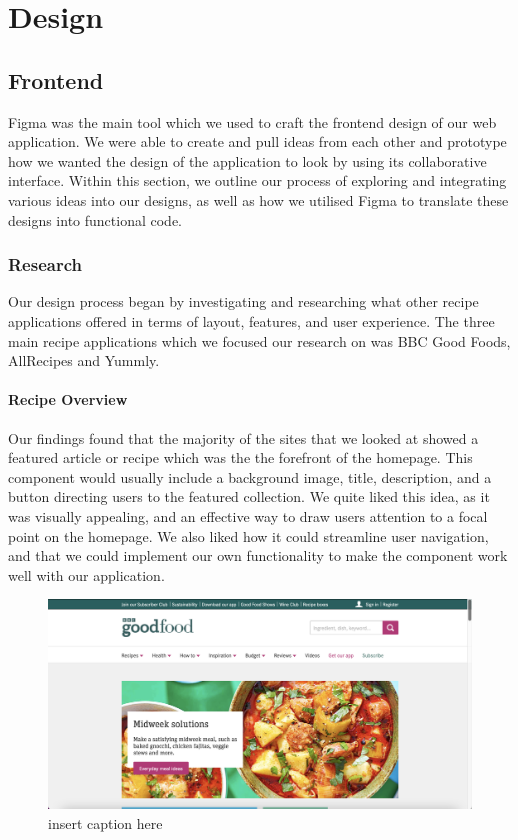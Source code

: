 \documentclass{article}
\begin{document}
    \section{Design}
    \subsection{Frontend}
    Figma was the main tool which we used to craft the frontend design of our web application. We were able to create and pull ideas from each other and prototype how we wanted the design of the application to look by using its collaborative interface. Within this section, we outline our process of exploring and integrating various ideas into our designs, as well as how we utilised Figma to translate these designs into functional code.

    \subsubsection{Research}
    
    Our design process began by investigating and researching what other recipe applications offered in terms of layout, features, and user experience. The three main recipe applications which we focused our research on was BBC Good Foods, AllRecipes and Yummly. 
    
    \paragraph{Recipe Overview}
    Our findings found that the majority of the sites that we looked at showed a featured article or recipe which was the the forefront of the homepage. This component would usually include a background image, title, description, and a button directing users to the featured collection. We quite liked this idea, as it was visually appealing, and an effective way to draw users attention to a focal point on the homepage. We also liked how it could streamline user navigation, and that we could implement our own functionality to make the component work well with our application.
    
    \begin{figure}
      \includegraphics[width=1.0\textwidth]{BBCGF featured-image.png}
      \centering
      \caption{insert caption here}
    \end{figure}
\end{document}
